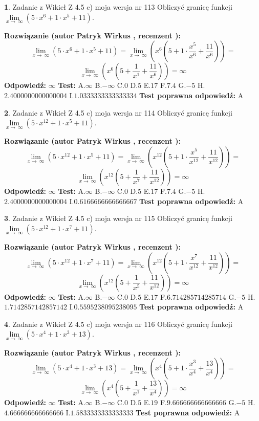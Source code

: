 \documentclass[12pt, a4paper]{article}
\theoremstyle{definition} %
\newtheorem{zad}{}
\newcommand{\zadStart}[1]{\begin{zad}#1\newline}
\newcommand{\zadStop}{\end{zad}}
\newcommand{\rozwStart}[2]{\noindent \textbf{Rozwiązanie (autor #1 , recenzent #2): }\newline}
\newcommand{\rozwStop}{\newline}
\newcommand{\odpStart}{\noindent \textbf{Odpowiedź:}\newline}
\newcommand{\odpStop}{\newline}
\newcommand{\testStart}{\noindent \textbf{Test:}\newline}
\newcommand{\testStop}{\newline}
\newcommand{\kluczStart}{\noindent \textbf{Test poprawna odpowiedź:}\newline}
\newcommand{\kluczStop}{\newline}
\begin{document}
\zadStart{Zadanie z Wikieł Z 4.5 c) moja wersja nr 113}
Obliczyć granicę funkcji  $\lim\limits_{x\to\ \infty}(5 \cdot x^{6}+1 \cdot x^{5}+11)$.
\zadStop
\rozwStart{Patryk Wirkus}{}
$$\lim\limits_{x\to\ \infty}(5 \cdot x^{6}+1 \cdot x^{5}+11) = \lim\limits_{x\to\ \infty}(x^{6}(5 +1 \cdot \frac{x^{5}}{x^{6}}+\frac{11}{x^{6}})) =$$ $$\lim\limits_{x\to\ \infty}(x^{6}(5 +\frac{1}{x^{1}}+\frac{11}{x^{6}})) =\infty$$
\rozwStop
\odpStart
$\infty$
\odpStop
\testStart
A.$\infty$ B.$-\infty$ C.$0$ D.$5$ E.$17$
F.$7.4$ G.$-5$
H.$2.4000000000000004$
I.$1.0333333333333334$
\testStop
\kluczStart
A
\kluczStop



\zadStart{Zadanie z Wikieł Z 4.5 c) moja wersja nr 114}
Obliczyć granicę funkcji  $\lim\limits_{x\to\ \infty}(5 \cdot x^{12}+1 \cdot x^{5}+11)$.
\zadStop
\rozwStart{Patryk Wirkus}{}
$$\lim\limits_{x\to\ \infty}(5 \cdot x^{12}+1 \cdot x^{5}+11) = \lim\limits_{x\to\ \infty}(x^{12}(5 +1 \cdot \frac{x^{5}}{x^{12}}+\frac{11}{x^{12}})) =$$ $$\lim\limits_{x\to\ \infty}(x^{12}(5 +\frac{1}{x^{7}}+\frac{11}{x^{12}})) =\infty$$
\rozwStop
\odpStart
$\infty$
\odpStop
\testStart
A.$\infty$ B.$-\infty$ C.$0$ D.$5$ E.$17$
F.$7.4$ G.$-5$
H.$2.4000000000000004$
I.$0.6166666666666667$
\testStop
\kluczStart
A
\kluczStop



\zadStart{Zadanie z Wikieł Z 4.5 c) moja wersja nr 115}
Obliczyć granicę funkcji  $\lim\limits_{x\to\ \infty}(5 \cdot x^{12}+1 \cdot x^{7}+11)$.
\zadStop
\rozwStart{Patryk Wirkus}{}
$$\lim\limits_{x\to\ \infty}(5 \cdot x^{12}+1 \cdot x^{7}+11) = \lim\limits_{x\to\ \infty}(x^{12}(5 +1 \cdot \frac{x^{7}}{x^{12}}+\frac{11}{x^{12}})) =$$ $$\lim\limits_{x\to\ \infty}(x^{12}(5 +\frac{1}{x^{5}}+\frac{11}{x^{12}})) =\infty$$
\rozwStop
\odpStart
$\infty$
\odpStop
\testStart
A.$\infty$ B.$-\infty$ C.$0$ D.$5$ E.$17$
F.$6.714285714285714$ G.$-5$
H.$1.7142857142857142$
I.$0.5595238095238095$
\testStop
\kluczStart
A
\kluczStop



\zadStart{Zadanie z Wikieł Z 4.5 c) moja wersja nr 116}
Obliczyć granicę funkcji  $\lim\limits_{x\to\ \infty}(5 \cdot x^{4}+1 \cdot x^{3}+13)$.
\zadStop
\rozwStart{Patryk Wirkus}{}
$$\lim\limits_{x\to\ \infty}(5 \cdot x^{4}+1 \cdot x^{3}+13) = \lim\limits_{x\to\ \infty}(x^{4}(5 +1 \cdot \frac{x^{3}}{x^{4}}+\frac{13}{x^{4}})) =$$ $$\lim\limits_{x\to\ \infty}(x^{4}(5 +\frac{1}{x^{1}}+\frac{13}{x^{4}})) =\infty$$
\rozwStop
\odpStart
$\infty$
\odpStop
\testStart
A.$\infty$ B.$-\infty$ C.$0$ D.$5$ E.$19$
F.$9.666666666666666$ G.$-5$
H.$4.666666666666666$
I.$1.5833333333333333$
\testStop
\kluczStart
A
\kluczStop
\end{document}

